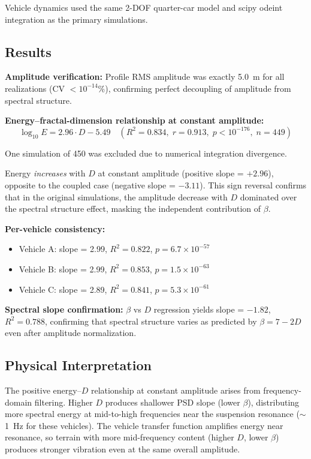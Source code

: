 \documentclass[11pt]{article}
\begin{document}
Vehicle dynamics used the same 2-DOF quarter-car model and scipy odeint integration as the primary simulations.

\subsection{Results}

\textbf{Amplitude verification:} Profile RMS amplitude was exactly 5.0~m for all realizations (CV $< 10^{-14}$\%), confirming perfect decoupling of amplitude from spectral structure.

\textbf{Energy--fractal-dimension relationship at constant amplitude:}
\begin{equation}
\log_{10} E = 2.96 \cdot D - 5.49 \quad (R^2 = 0.834,\; r = 0.913,\; p < 10^{-176},\; n = 449)
\end{equation}

\noindent One simulation of 450 was excluded due to numerical integration divergence.

Energy \emph{increases} with $D$ at constant amplitude (positive slope = $+2.96$), opposite to the coupled case (negative slope = $-3.11$). This sign reversal confirms that in the original simulations, the amplitude decrease with $D$ dominated over the spectral structure effect, masking the independent contribution of $\beta$.

\textbf{Per-vehicle consistency:}
\begin{itemize}
\item Vehicle A: slope = 2.99, $R^2 = 0.822$, $p = 6.7 \times 10^{-57}$
\item Vehicle B: slope = 2.99, $R^2 = 0.853$, $p = 1.5 \times 10^{-63}$
\item Vehicle C: slope = 2.89, $R^2 = 0.841$, $p = 5.3 \times 10^{-61}$
\end{itemize}

\textbf{Spectral slope confirmation:} $\beta$ vs $D$ regression yields slope = $-1.82$, $R^2 = 0.788$, confirming that spectral structure varies as predicted by $\beta = 7-2D$ even after amplitude normalization.

\subsection{Physical Interpretation}

The positive energy--$D$ relationship at constant amplitude arises from frequency-domain filtering. Higher $D$ produces shallower PSD slope (lower $\beta$), distributing more spectral energy at mid-to-high frequencies near the suspension resonance ($\sim$1~Hz for these vehicles). The vehicle transfer function amplifies energy near resonance, so terrain with more mid-frequency content (higher $D$, lower $\beta$) produces stronger vibration even at the same overall amplitude.
\end{document}
